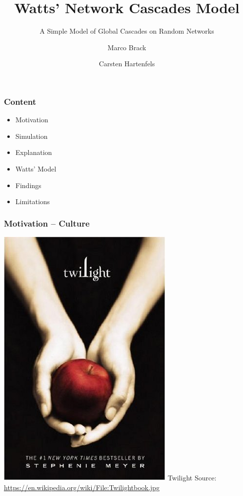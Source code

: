 \documentclass[slidestop,usenames,dvipsnames]{beamer}
\title{Watts' Network Cascades Model}
\subtitle{A Simple Model of Global Cascades on Random Networks}
\author{Marco Brack \and Carsten Hartenfels}
\newcommand{\gitem}{\vfill\item}
\begin{document}
\begin{frame}
    \titlepage
\end{frame}




\begin{frame}
    \frametitle{Content}
    \begin{itemize}
        \gitem Motivation
        \gitem Simulation
        \gitem Explanation
        \gitem Watts' Model
        \gitem Findings
        \gitem Limitations
    \end{itemize}
    \vfill
\end{frame}


\begin{frame}
    \frametitle{Motivation -- Culture}
    \begin{center}
        \includegraphics[height=0.65\textheight]{img/twilight}
        \vfill\vspace{8pt}
        {\huge Twilight}
        \vfill\vspace{8pt}
        {\small Source: \url{https://en.wikipedia.org/wiki/File:Twilightbook.jpg}}
    \end{center}
    \vfill
\end{frame}
\end{document}
